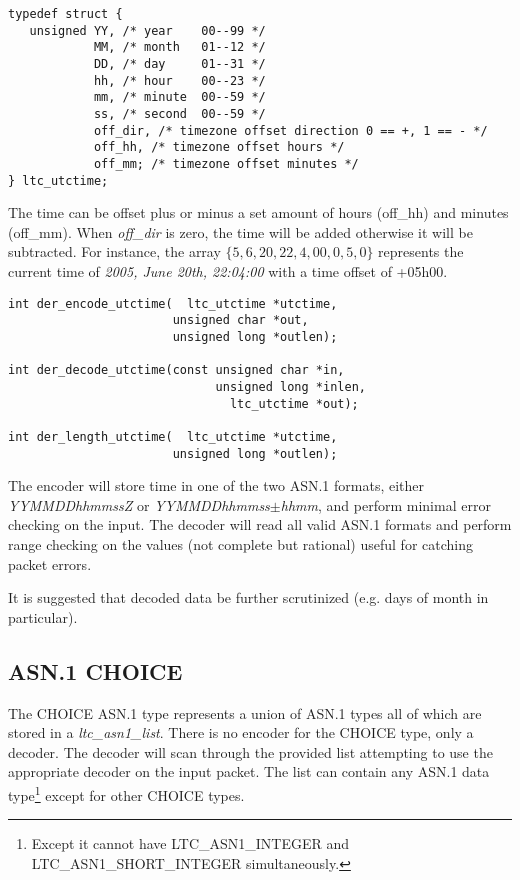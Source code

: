\documentclass[synpaper]{book}
\begin{document}
\begin{verbatim}
typedef struct {
   unsigned YY, /* year    00--99 */
            MM, /* month   01--12 */
            DD, /* day     01--31 */
            hh, /* hour    00--23 */
            mm, /* minute  00--59 */
            ss, /* second  00--59 */
            off_dir, /* timezone offset direction 0 == +, 1 == - */
            off_hh, /* timezone offset hours */
            off_mm; /* timezone offset minutes */
} ltc_utctime;
\end{verbatim}

The time can be offset plus or minus a set amount of hours (off\_hh) and minutes (off\_mm).  When \textit{off\_dir} is zero, the time will be added otherwise it 
will be subtracted.  For instance, the array $\lbrace 5, 6, 20, 22, 4, 00, 0, 5, 0 \rbrace$ represents the current time of 
\textit{2005, June 20th, 22:04:00} with a time offset of +05h00.  

\begin{verbatim}
int der_encode_utctime(  ltc_utctime *utctime, 
                       unsigned char *out,   
                       unsigned long *outlen);

int der_decode_utctime(const unsigned char *in, 
                             unsigned long *inlen,
                               ltc_utctime *out);

int der_length_utctime(  ltc_utctime *utctime, 
                       unsigned long *outlen);
\end{verbatim}

The encoder will store time in one of the two ASN.1 formats, either \textit{YYMMDDhhmmssZ} or \textit{YYMMDDhhmmss$\pm$hhmm}, and perform minimal error checking on the 
input.  The decoder will read all valid ASN.1 formats and perform range checking on the values (not complete but rational) useful for catching packet errors.

It is suggested that decoded data be further scrutinized (e.g. days of month in particular).

\subsection{ASN.1 CHOICE}

The CHOICE ASN.1 type represents a union of ASN.1 types all of which are stored in a \textit{ltc\_asn1\_list}.  There is no encoder for the CHOICE type, only a 
decoder.  The decoder will scan through the provided list attempting to use the appropriate decoder on the input packet.  The list can contain any ASN.1 data
type\footnote{Except it cannot have LTC\_ASN1\_INTEGER and LTC\_ASN1\_SHORT\_INTEGER simultaneously.} except for other CHOICE types.  
\end{document}
